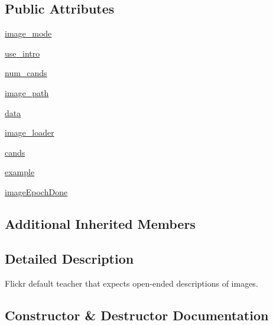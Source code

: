 \subsection*{Public Attributes}
\begin{DoxyCompactItemize}
\item 
\hyperlink{classparlai_1_1tasks_1_1flickr30k_1_1agents_1_1DefaultTeacher_a9172db25337a0e2c2c8348c0f2d63d69}{image\+\_\+mode}
\item 
\hyperlink{classparlai_1_1tasks_1_1flickr30k_1_1agents_1_1DefaultTeacher_a26c3c801b4cd7566cf554c6398e893ce}{use\+\_\+intro}
\item 
\hyperlink{classparlai_1_1tasks_1_1flickr30k_1_1agents_1_1DefaultTeacher_ab11d2ec093158073e7188bcc4170c56a}{num\+\_\+cands}
\item 
\hyperlink{classparlai_1_1tasks_1_1flickr30k_1_1agents_1_1DefaultTeacher_afbcd6505a2f71a7f55429ea316c2a7ea}{image\+\_\+path}
\item 
\hyperlink{classparlai_1_1tasks_1_1flickr30k_1_1agents_1_1DefaultTeacher_a91027d6545dc40fbd4ed09f34404d8e5}{data}
\item 
\hyperlink{classparlai_1_1tasks_1_1flickr30k_1_1agents_1_1DefaultTeacher_a10f2d48d9fabab085243366a708b8f9a}{image\+\_\+loader}
\item 
\hyperlink{classparlai_1_1tasks_1_1flickr30k_1_1agents_1_1DefaultTeacher_a2a1b276618cd9efb01b7b0f21ff338ec}{cands}
\item 
\hyperlink{classparlai_1_1tasks_1_1flickr30k_1_1agents_1_1DefaultTeacher_a541ebd56a221be4a71669e6ff799cf14}{example}
\item 
\hyperlink{classparlai_1_1tasks_1_1flickr30k_1_1agents_1_1DefaultTeacher_a5998c19d0306b5571d17aa38bbc22f73}{image\+Epoch\+Done}
\end{DoxyCompactItemize}
\subsection*{Additional Inherited Members}


\subsection{Detailed Description}
\begin{DoxyVerb}Flickr default teacher that expects open-ended descriptions of images.
\end{DoxyVerb}
 

\subsection{Constructor \& Destructor Documentation}
\mbox{\label{classparlai_1_1tasks_1_1flickr30k_1_1agents_1_1DefaultTeacher_a656b935d2ed6a7c7c17ec8701c506cc8}} 
